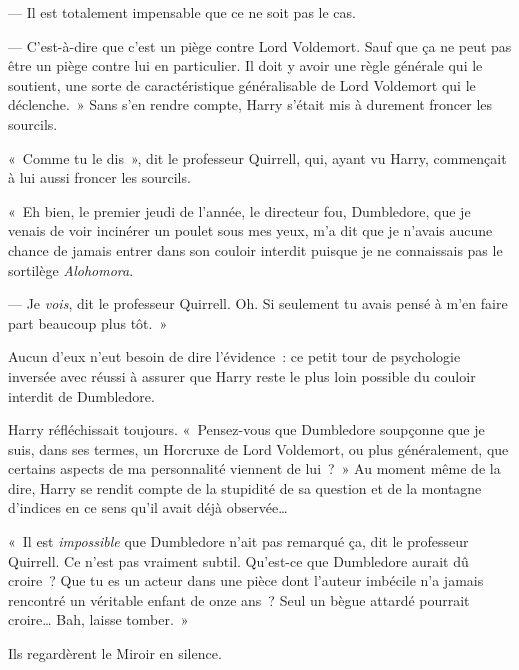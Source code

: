 --- Il est totalement impensable que ce ne soit pas le cas.

--- C'est-à-dire que c'est un piège contre Lord Voldemort.
Sauf que ça ne peut pas être un piège contre lui en particulier.
Il doit y avoir une règle générale qui le soutient, une sorte de caractéristique généralisable de Lord Voldemort qui le déclenche.~»
Sans s'en rendre compte, Harry s'était mis à durement froncer les sourcils.

«~Comme tu le dis~», dit le professeur Quirrell, qui, ayant vu Harry, commençait à lui aussi froncer les sourcils.

«~Eh bien, le premier jeudi de l'année, le directeur fou, Dumbledore, que je venais de voir incinérer un poulet sous mes yeux, m'a dit que je n'avais aucune chance de jamais entrer dans son couloir interdit puisque je ne connaissais pas le sortilège \emph{Alohomora}.

--- Je \emph{vois}, dit le professeur Quirrell.
Oh. Si seulement tu avais pensé à m'en faire part beaucoup plus tôt.~»

Aucun d'eux n'eut besoin de dire l'évidence~: ce petit tour de psychologie inversée avec réussi à assurer que Harry reste le plus loin possible du couloir interdit de Dumbledore.

Harry réfléchissait toujours.
«~Pensez-vous que Dumbledore soupçonne que je suis, dans ses termes, un Horcruxe de Lord Voldemort, ou plus généralement, que certains aspects de ma personnalité viennent de lui~?~»
Au moment même de la dire, Harry se rendit compte de la stupidité de sa question et de la montagne d'indices en ce sens qu'il avait déjà observée…

«~Il est \emph{impossible} que Dumbledore n'ait pas remarqué ça, dit le professeur Quirrell.
Ce n'est pas vraiment subtil.
Qu'est-ce que Dumbledore aurait dû croire~?
Que tu es un acteur dans une pièce dont l'auteur imbécile n'a jamais rencontré un véritable enfant de onze ans~?
Seul un bègue attardé pourrait croire…
Bah, laisse tomber.~»

Ils regardèrent le Miroir en silence.

